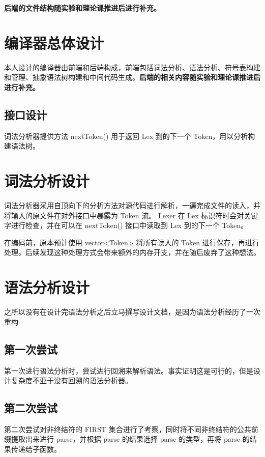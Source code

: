 \documentclass[a4paper]{article}
\begin{document}
	\textbf{后端的文件结构随实验和理论课推进后进行补充。}
	
	\section{编译器总体设计}
	
		本人设计的编译器由前端和后端构成，前端包括词法分析、语法分析、符号表构建和管理、抽象语法树构建和中间代码生成。\textbf{后端的相关内容随实验和理论课推进后进行补充。}
		
		\subsection{接口设计}
		
		词法分析器提供方法 nextToken() 用于返回 Lex 到的下一个 Token，用以分析构建语法树。
	
	\section{词法分析设计}
	
		词法分析器采用自顶向下的分析方法对源代码进行解析，一遍完成文件的读入，并将输入的原文件在对外接口中暴露为 Token 流。 
		Lexer 在 Lex 标识符时会对关键字进行检查，并在可以在 nextToken() 接口中读取到 Lex 到的下一个 Token。
		
		在编码前，原本预计使用 vector<Token> 将所有读入的 Token 进行保存，再进行处理。后续发现这种处理方式会带来额外的内存开支，并在随后废弃了这种想法。
	
	\section{语法分析设计}

		之所以没有在设计完语法分析之后立马撰写设计文档，是因为语法分析经历了一次重构
		
		\subsection{第一次尝试}
		
			第一次进行语法分析时，尝试进行回溯来解析语法。事实证明这是可行的，但是设计复杂度不亚于没有回溯的语法分析器。
			
		\subsection{第二次尝试}
		
			第二次尝试对非终结符的 FIRST 集合进行了考察，同时将不同非终结符的公共前缀提取出来进行 parse，并根据 parse 的结果选择 parse 的类型，再将 parse 的结果传递给子函数。
			
\end{document}

